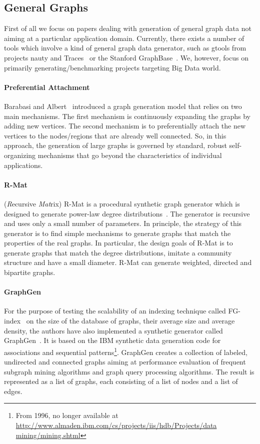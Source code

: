 \subsection{General Graphs}
\label{sec:generators_general}

First of all we focus on papers dealing with generation of general graph
data not aiming at a particular application domain. Currently, there exists a
number of tools which involve a kind of general graph data generator, such as
gtools from projects nauty and Traces~\cite{gtools} or the Stanford
GraphBase~\cite{GraphBase}. We, however, focus on primarily
generating/benchmarking projects targeting Big Data world.


\paragraph {Preferential Attachment} Barabasi and Albert~\cite{Barabasi99emergenceScaling} introduced a graph generation model that relies on two main mechanisms. The first mechanism is continuously expanding the graphs by adding new vertices. The second mechanism is to preferentially attach the new vertices   to the nodes/regions that are already well connected. So, in this approach, the generation of large graphs is governed by standard, robust self-organizing mechanisms that go beyond the characteristics of individual applications.

\paragraph {R-Mat} (\emph{R}ecursive \emph{Mat}rix) R-Mat is a procedural synthetic graph generator which is designed to generate power-law degree
distributions~\cite{DBLP:conf/sdm/ChakrabartiZF04}.
The generator is recursive and uses only a small number of parameters.
In principle, the strategy of this generator is to find simple mechanisms to generate graphs that match
the properties of the real graphs. In particular, the design goals of R-Mat is to generate graphs that match the degree distributions, imitate a community structure and have a small diameter. R-Mat can generate weighted, directed and bipartite graphs.

\paragraph{GraphGen} For the purpose of testing the scalability of an indexing
technique called FG-index~\cite{Cheng:2007:FTV:1247480.1247574} on the size of the
database of graphs, their average size and average density, the authors have
also implemented a synthetic generator called GraphGen~\cite{GraphGen}. It is
based on the IBM synthetic data generation code for associations and sequential
patterns\footnote{From 1996, no longer available at
\url{http://www.almaden.ibm.com/cs/projects/iis/hdb/Projects/data
mining/mining.shtml}}. GraphGen creates a collection of labeled, undirected and
connected graphs aiming at performance evaluation of frequent subgraph mining
algorithms and graph query processing algorithms. The result is represented as a
list of graphs, each consisting of a list of nodes and a list of edges.




